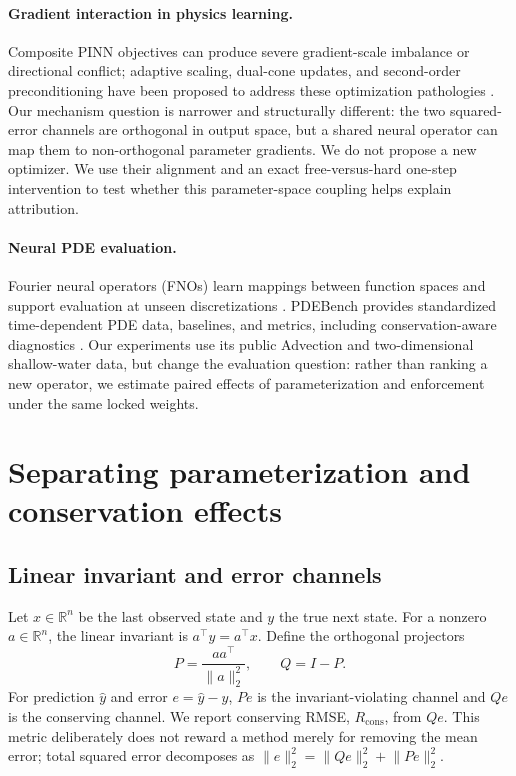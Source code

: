 \documentclass{article}
\newcommand{\Rcons}{R_{\mathrm{cons}}}
\begin{document}
\paragraph{Gradient interaction in physics learning.}
Composite PINN objectives can produce severe gradient-scale imbalance or directional conflict;
adaptive scaling, dual-cone updates, and second-order preconditioning have been proposed to address
these optimization pathologies \citep{yao2023multiadam,hwang2024dcgd,wang2025gradient}. Our
mechanism question is narrower and structurally different: the two squared-error channels are
orthogonal in output space, but a shared neural operator can map them to non-orthogonal parameter
gradients. We do not propose a new optimizer. We use their alignment and an exact free-versus-hard
one-step intervention to test whether this parameter-space coupling helps explain attribution.

\paragraph{Neural PDE evaluation.}
Fourier neural operators (FNOs) learn mappings between function spaces and support evaluation at
unseen discretizations \citep{li2021fno}. PDEBench provides standardized time-dependent PDE data,
baselines, and metrics, including conservation-aware diagnostics \citep{pdebench}. Our experiments
use its public Advection and two-dimensional shallow-water data, but change the evaluation
question: rather than ranking a new operator, we estimate paired effects of parameterization and
enforcement under the same locked weights.

\section{Separating parameterization and conservation effects}
\label{sec:audit}

\subsection{Linear invariant and error channels}

Let $x\in\mathbb{R}^n$ be the last observed state and $y$ the true next state. For a nonzero
$a\in\mathbb{R}^n$, the linear invariant is $a^\top y=a^\top x$. Define the orthogonal projectors
\begin{equation}
  P=\frac{aa^\top}{\lVert a\rVert_2^2},\qquad Q=I-P.
\end{equation}
For prediction $\hat y$ and error $e=\hat y-y$, $Pe$ is the invariant-violating channel and $Qe$
is the conserving channel. We report conserving RMSE, $\Rcons$, from $Qe$. This metric deliberately
does not reward a method merely for removing the mean error; total squared error decomposes as
$\lVert e\rVert_2^2=\lVert Qe\rVert_2^2+\lVert Pe\rVert_2^2$.
\end{document}
